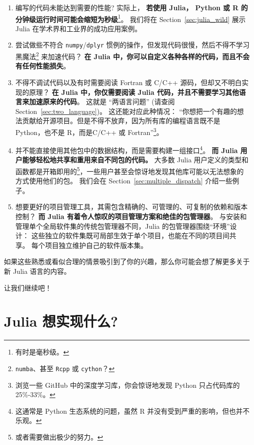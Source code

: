 \documentclass[
  notoc %
]{tufte-book}
\newcommand{\passthrough}[1]{#1}
\begin{document}
\begin{enumerate}
\def\labelenumi{\arabic{enumi}.}
\item
  编写的代码未能达到需要的性能? 实际上， \textbf{若使用 Julia， Python
  或 R 的分钟级运行时间可能会缩短为秒级}\footnote{有时是毫秒级。}。
  我们将在 Section~\ref{sec:julia_wild} 展示 Julia
  在学术界和工业界的成功应用案例。
\item
  尝试做些不符合
  \passthrough{\lstinline!numpy!}/\passthrough{\lstinline!dplyr!}
  惯例的操作，但发现代码很慢，然后不得不学习黑魔法\footnote{\passthrough{\lstinline!numba!}、甚至
    \passthrough{\lstinline!Rcpp!} 或 \passthrough{\lstinline!cython!}？}
  来加速代码？ \textbf{在 Julia
  中，你可以自定义各种各样的代码，而且不会有任何性能损失}。
\item
  不得不调试代码以及有时需要阅读 Fortran 或 C/C++
  源码，但却又不明白实现的原理？ \textbf{在 Julia 中，你仅需要阅读 Julia
  代码，并且不需要学习其他语言来加速原来的代码}。 这就是 ``两语言问题''
  (请查阅 Section~\ref{sec:two_language})。 这还能对应此种情况：
  ``你想把一个有趣的想法贡献给开源项目。但是不得不放弃，因为所有库的编程语言既不是
  Python，也不是 R，而是C/C++ 或 Fortran''\footnote{浏览一些 GitHub
    中的深度学习库，你会惊讶地发现 Python 只占代码库的25\%-33\%。}。
\item
  并不能直接使用其他包中的数据结构，而是需要构建一组接口\footnote{这通常是
    Python 生态系统的问题，虽然 R 并没有受到严重的影响，但也并不乐观。}。
  \textbf{而 Julia 用户能够轻松地共享和重用来自不同包的代码。} 大多数
  Julia
  用户定义的类型和函数都是开箱即用的\footnote{或者需要做出极少的努力。}，一些用户甚至会惊讶地发现其他库可能以无法想象的方式使用他们的包。
  我们会在 Section~\ref{sec:multiple_dispatch} 介绍一些例子。
\item
  想要更好的项目管理工具，其需包含精确的、可管理的、可复制的依赖和版本控制？
  \textbf{而 Julia 有着令人惊叹的项目管理方案和绝佳的包管理器}。
  与安装和管理单个全局软件集的传统包管理器不同，Julia
  的包管理器围绕``环境''设计：
  这些独立的软件集既可局部生效于单个项目，也能在不同的项目间共享。
  每个项目独立维护自己的软件版本集。
\end{enumerate}

如果这些熟悉或看似合理的情景吸引到了你的兴趣，那么你可能会想了解更多关于新
Julia 语言的内容。

让我们继续吧！

\hypertarget{sec:julia_accomplish}{%
\section{Julia 想实现什么?}\label{sec:julia_accomplish}}
\end{document}
